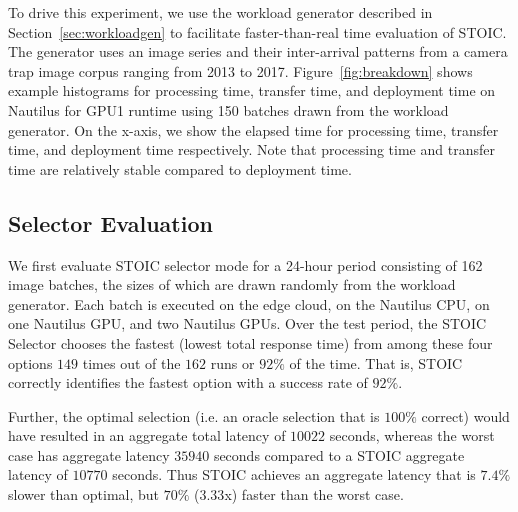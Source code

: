 To drive this experiment, we use the workload generator described in Section~\ref{sec:workloadgen} to facilitate faster-than-real time evaluation of STOIC. The generator uses an image series and their inter-arrival patterns from a camera trap image corpus ranging from 2013 to 2017. Figure~\ref{fig:breakdown} shows example histograms for processing time, transfer time, and deployment time on Nautilus for GPU1 runtime using 150 batches drawn from the workload generator. On the x-axis, we show the elapsed time for processing time, transfer time, and deployment time respectively. Note that processing time and transfer time are relatively stable compared to deployment time. 

\subsection{Selector Evaluation}

We first evaluate STOIC selector mode for a 24-hour period consisting of 162 image batches, the sizes of which are drawn randomly from the workload generator. Each batch is executed on the edge cloud, on the Nautilus CPU, on one Nautilus GPU, and two Nautilus GPUs. Over the test period, the STOIC Selector chooses the fastest (lowest total response time) from among these four options $149$ times out of the $162$ runs or $92\%$ of the time. That is, STOIC correctly identifies the fastest option with a success rate of $92\%$.

Further, the optimal selection (i.e. an oracle selection that is $100\%$ correct) would have resulted in an aggregate total latency of $10022$ seconds, whereas the worst case has aggregate latency $35940$ seconds compared to a STOIC aggregate latency of $10770$ seconds.  Thus STOIC achieves an aggregate latency that is $7.4\%$ slower than optimal, but $70\%$ ($3.33$x) faster than the worst case.


%

